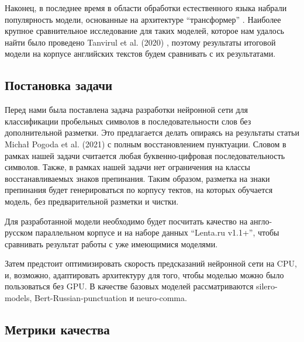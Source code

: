 \documentclass[a4paper,14pt]{extarticle}
\begin{document}
Наконец, в последнее время в области обработки естественного языка набрали популярность модели, основанные на архитектуре \enquote{трансформер} \cite{vaswani_attention_2017}.
Наиболее крупное сравнительное исследование для таких моделей, которое нам удалось найти было проведено Tanvirul et al. (2020) \cite{alam_punctuation_2020}, поэтому результаты итоговой модели на корпусе английских текстов будем сравнивать с их результатами.

\subsection{Постановка задачи}

Перед нами была поставлена задача разработки нейронной сети для классификации пробельных символов в последовательности слов без дополнительной разметки. Это предлагается делать опираясь на результаты статьи Michał Pogoda et al. (2021) \cite{pogoda_comprehensive_2021} с полным восстановлением пунктуации.
Словом в рамках нашей задачи считается любая буквенно-цифровая последовательность символов.
Также, в рамках нашей задачи нет ограничения на классы восстанавливаемых знаков препинания.
Таким образом, разметка на знаки препинания будет генерироваться по корпусу тектов, на которых обучается модель, без предварительной разметки и чистки.

Для разработанной модели необходимо будет посчитать качество на англо-русском параллельном корпусе и на наборе данных \enquote{Lenta.ru v1.1+}, чтобы сравнивать результат работы с уже имеющимися моделями.

Затем предстоит оптимизировать скорость предсказаний нейронной сети на CPU, и, возможно, адаптировать архитектуру для того, чтобы моделью можно было пользоваться без GPU.
В качестве базовых моделей рассматриваются silero-models, Bert-Russian-punctuation и neuro-comma.

\subsection{Метрики качества}
\end{document}
